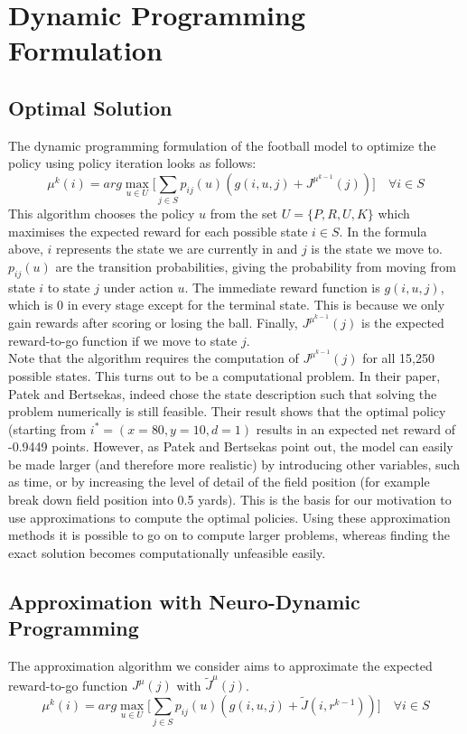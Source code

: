 \documentclass[11pt, oneside]{article}   	%
\begin{document}
\newpage
\section{Dynamic Programming Formulation}

\subsection{Optimal Solution}
The dynamic programming formulation of the football model to optimize the policy using policy iteration looks as follows:
$$
\mu^{k}(i) = arg\max\limits_{u \in U} \Big[ \sum\limits_{j \in S} p_{ij}(u)(g(i,u,j) +  J^{\mu^{k-1}}(j))\Big] \quad \forall i \in S
$$
This algorithm chooses the policy $u$ from the set $U=\{P,R,U,K\}$ which maximises the expected reward for each possible state $i \in S$. In the formula above, $i$ represents the state we are currently in and $j$ is the state we move to. $p_{ij}(u)$ are the transition probabilities, giving the probability from moving from state $i$ to state $j$ under action $u$. The immediate reward function is $g(i,u,j)$, which is 0 in every stage except for the terminal state. This is because we only gain rewards after scoring or losing the ball. Finally, $J^{\mu^{k-1}}(j)$ is the expected reward-to-go function if we move to state $j$. \\

Note that the algorithm requires the computation of $J^{\mu^{k-1}}(j)$ for all 15,250 possible states. This turns out to be a computational problem. In their paper, Patek and Bertsekas, indeed chose the state description such that solving the problem numerically is still feasible. Their result shows that the optimal policy (starting from $i^*=(x=80,y=10,d=1)$ results in an expected net reward of -0.9449 points. 
However, as Patek and Bertsekas point out, the model can easily be made larger (and therefore more realistic) by introducing other variables, such as time, or by increasing the level of detail of the field position (for example break down field position into 0.5 yards). This is the basis for our motivation to use approximations to compute the optimal policies. Using these approximation methods it is possible to go on to compute larger problems, whereas finding the exact solution becomes computationally unfeasible easily.



\subsection{Approximation with Neuro-Dynamic Programming}
The approximation algorithm we consider aims to approximate the expected reward-to-go function $J^{\mu}(j)$ with $\widetilde{J}^{\mu}(j)$.
$$
\mu^{k}(i) = arg\max\limits_{u \in U} \Big[ \sum\limits_{j \in S} p_{ij}(u)(g(i,u,j) +  \widetilde{J}(i,r^{k-1}))\Big] \quad \forall i \in S
$$
\end{document}
